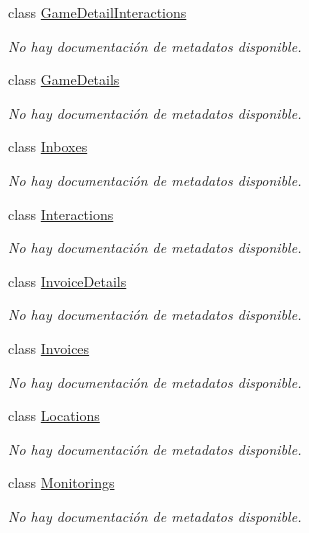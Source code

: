 \begin{DoxyCompactItemize}
class \hyperlink{class_game_memory_1_1_game_detail_interactions}{Game\-Detail\-Interactions}
\begin{DoxyCompactList}\small\item\em No hay documentación de metadatos disponible. \end{DoxyCompactList}\item 
class \hyperlink{class_game_memory_1_1_game_details}{Game\-Details}
\begin{DoxyCompactList}\small\item\em No hay documentación de metadatos disponible. \end{DoxyCompactList}\item 
class \hyperlink{class_game_memory_1_1_inboxes}{Inboxes}
\begin{DoxyCompactList}\small\item\em No hay documentación de metadatos disponible. \end{DoxyCompactList}\item 
class \hyperlink{class_game_memory_1_1_interactions}{Interactions}
\begin{DoxyCompactList}\small\item\em No hay documentación de metadatos disponible. \end{DoxyCompactList}\item 
class \hyperlink{class_game_memory_1_1_invoice_details}{Invoice\-Details}
\begin{DoxyCompactList}\small\item\em No hay documentación de metadatos disponible. \end{DoxyCompactList}\item 
class \hyperlink{class_game_memory_1_1_invoices}{Invoices}
\begin{DoxyCompactList}\small\item\em No hay documentación de metadatos disponible. \end{DoxyCompactList}\item 
class \hyperlink{class_game_memory_1_1_locations}{Locations}
\begin{DoxyCompactList}\small\item\em No hay documentación de metadatos disponible. \end{DoxyCompactList}\item 
class \hyperlink{class_game_memory_1_1_monitorings}{Monitorings}
\begin{DoxyCompactList}\small\item\em No hay documentación de metadatos disponible. \end{DoxyCompactList}\item 

\end{DoxyCompactItemize}
